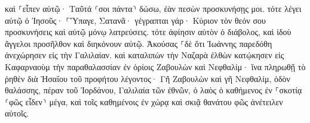 \documentclass{openreader}
\begin{document}
καὶ ⸀εἶπεν αὐτῷ· Ταῦτά ⸂σοι πάντα⸃ δώσω, ἐὰν πεσὼν προσκυνήσῃς μοι. 
τότε λέγει αὐτῷ ὁ Ἰησοῦς· ⸀Ὕπαγε, Σατανᾶ· γέγραπται γάρ· Κύριον τὸν θεόν σου προσκυνήσεις καὶ αὐτῷ μόνῳ λατρεύσεις. 
τότε ἀφίησιν αὐτὸν ὁ διάβολος, καὶ ἰδοὺ ἄγγελοι προσῆλθον καὶ διηκόνουν αὐτῷ. 
Ἀκούσας ⸀δὲ ὅτι Ἰωάννης παρεδόθη ἀνεχώρησεν εἰς τὴν Γαλιλαίαν. 
καὶ καταλιπὼν τὴν Ναζαρὰ ἐλθὼν κατῴκησεν εἰς Καφαρναοὺμ τὴν παραθαλασσίαν ἐν ὁρίοις Ζαβουλὼν καὶ Νεφθαλίμ· 
ἵνα πληρωθῇ τὸ ῥηθὲν διὰ Ἠσαΐου τοῦ προφήτου λέγοντος· 
Γῆ Ζαβουλὼν καὶ γῆ Νεφθαλίμ, ὁδὸν θαλάσσης, πέραν τοῦ Ἰορδάνου, Γαλιλαία τῶν ἐθνῶν, 
ὁ λαὸς ὁ καθήμενος ἐν ⸀σκοτίᾳ ⸂φῶς εἶδεν⸃ μέγα, καὶ τοῖς καθημένοις ἐν χώρᾳ καὶ σκιᾷ θανάτου φῶς ἀνέτειλεν αὐτοῖς. 
\end{document}
